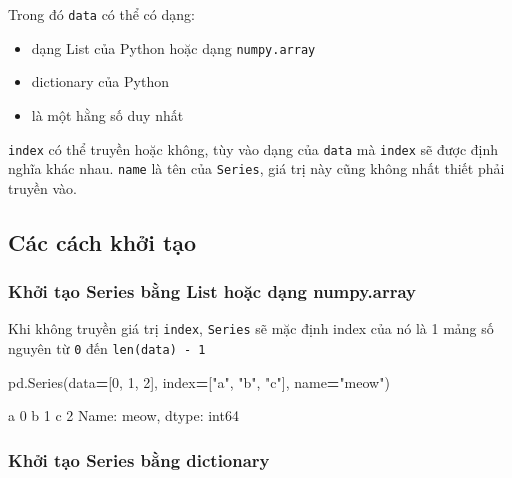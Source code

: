 \documentclass[
]{book}
\newenvironment{Shaded}{\begin{snugshade}}{\end{snugshade}}
\newcommand{\DecValTok}[1]{\textcolor[rgb]{0.00,0.00,0.81}{#1}}
\newcommand{\NormalTok}[1]{#1}
\newcommand{\OperatorTok}[1]{\textcolor[rgb]{0.81,0.36,0.00}{\textbf{#1}}}
\newcommand{\StringTok}[1]{\textcolor[rgb]{0.31,0.60,0.02}{#1}}
\begin{document}
Trong đó \texttt{data} có thể có dạng:

\begin{itemize}
\item
  dạng List của Python hoặc dạng \texttt{numpy.array}
\item
  dictionary của Python
\item
  là một hằng số duy nhất
\end{itemize}

\texttt{index} có thể truyền hoặc không, tùy vào dạng của \texttt{data} mà \texttt{index} sẽ được định nghĩa khác nhau.
\texttt{name} là tên của \texttt{Series}, giá trị này cũng không nhất thiết phải truyền vào.

\subsection{Các cách khởi tạo}\label{cuxe1c-cuxe1ch-khux1edfi-tux1ea1o}

\subsubsection*{Khởi tạo Series bằng List hoặc dạng numpy.array}\label{khux1edfi-tux1ea1o-series-bux1eb1ng-list-houx1eb7c-dux1ea1ng-numpy.array}


Khi không truyền giá trị \texttt{index}, \texttt{Series} sẽ mặc định index của nó là 1 mảng số nguyên từ \texttt{0} đến \texttt{len(data)\ -\ 1}

\begin{Shaded}
\begin{Highlighting}[]
\NormalTok{pd.Series(data}\OperatorTok{=}\NormalTok{[}\DecValTok{0}\NormalTok{, }\DecValTok{1}\NormalTok{, }\DecValTok{2}\NormalTok{], index}\OperatorTok{=}\NormalTok{[}\StringTok{"a"}\NormalTok{, }\StringTok{"b"}\NormalTok{, }\StringTok{"c"}\NormalTok{], name}\OperatorTok{=}\StringTok{"meow"}\NormalTok{)}
\end{Highlighting}
\end{Shaded}

\begin{Shaded}
\begin{Highlighting}[]
\NormalTok{a    0}
\NormalTok{b    1}
\NormalTok{c    2}
\NormalTok{Name: meow, dtype: int64}
\end{Highlighting}
\end{Shaded}

\subsubsection*{Khởi tạo Series bằng dictionary}\label{khux1edfi-tux1ea1o-series-bux1eb1ng-dictionary}
\end{document}
